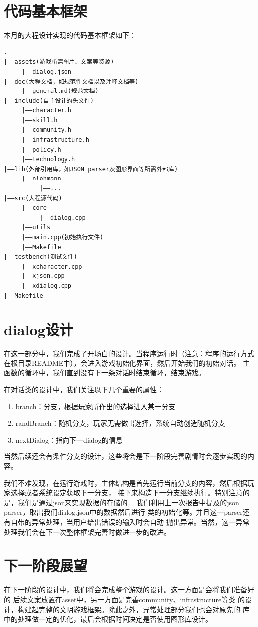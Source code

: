 \documentclass[UTF8]{ctexart}
\begin{document}
    \section{代码基本框架}
    本月的大程设计实现的代码基本框架如下：
\begin{lstlisting}
.
|——assets(游戏所需图片、文案等资源)
     |——dialog.json
|——doc(大程文档，如规范性文档以及注释文档等)
     |——general.md(规范文档)
|——include(自主设计的头文件)
     |——character.h
     |——skill.h
     |——community.h
     |——infrastructure.h
     |——policy.h
     |——technology.h
|——lib(外部引用库，如JSON parser及图形界面等所需外部库)
     |——nlohmann
          |——...
|——src(大程源代码)
     |——core
          |——dialog.cpp
     |——utils
     |——main.cpp(初始执行文件)
     |——Makefile
|——testbench(测试文件)
     |——xcharacter.cpp
     |——xjson.cpp
     |——xdialog.cpp
|——Makefile
\end{lstlisting}
    
    \section{dialog设计}
    在这一部分中，我们完成了开场白的设计。当程序运行时（注意：程序的运行方式
    在根目录README中），会进入游戏初始化界面，然后开始我们的初始对话。
    主函数的循环中，我们直到没有下一条对话时结束循环，结束游戏。

    在对话类的设计中，我们关注以下几个重要的属性：
    \begin{enumerate}
        \item branch：分支，根据玩家所作出的选择进入某一分支
        \item randBranch：随机分支，玩家无需做出选择，系统自动创造随机分支
        \item nextDialog：指向下一dialog的信息
    \end{enumerate}
    
    当然后续还会有条件分支的设计，这些将会是下一阶段完善剧情时会逐步实现的内容。

    我们不难发现，在运行游戏时，主体结构是首先运行当前分支的内容，然后根据玩家选择或者系统设定获取下一分支，
    接下来构造下一分支继续执行。特别注意的是，我们是通过json来实现数据的存储的，
    我们利用上一次报告中提及的json parser，取出我们dialog.json中的数据然后进行
    类的初始化等。并且这一parser还有自带的异常处理，当用户给出错误的输入时会自动
    抛出异常。当然，这一异常处理我们会在下一次整体框架完善时做进一步的改进。
    
    \section{下一阶段展望}
    在下一阶段的设计中，我们将会完成整个游戏的设计。这一方面是会将我们准备好的
    后续文案放置在asset中，另一方面是完善community、infrastructure等类
    的设计，构建起完整的文明游戏框架。除此之外，异常处理部分我们也会对原先的
    库中的处理做一定的优化，最后会根据时间决定是否使用图形库设计。
\end{document}
